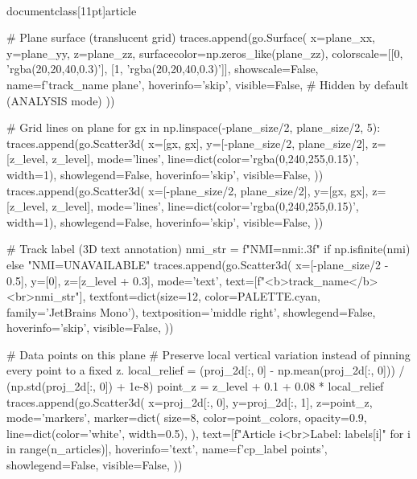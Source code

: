 \\documentclass[11pt]{article}
\begin{document}
\begin{CodeBlock}
{{{        # Plane surface (translucent grid)
        traces.append(go.Surface(
            x=plane_xx,
            y=plane_yy,
            z=plane_zz,
            surfacecolor=np.zeros_like(plane_zz),
            colorscale=[[0, 'rgba(20,20,40,0.3)'], [1, 'rgba(20,20,40,0.3)']],
            showscale=False,
            name=f'{track_name} plane',
            hoverinfo='skip',
            visible=False,  # Hidden by default (ANALYSIS mode)
        ))

        # Grid lines on plane
        for gx in np.linspace(-plane_size/2, plane_size/2, 5):
            traces.append(go.Scatter3d(
                x=[gx, gx],
                y=[-plane_size/2, plane_size/2],
                z=[z_level, z_level],
                mode='lines',
                line=dict(color='rgba(0,240,255,0.15)', width=1),
                showlegend=False,
                hoverinfo='skip',
                visible=False,
            ))
            traces.append(go.Scatter3d(
                x=[-plane_size/2, plane_size/2],
                y=[gx, gx],
                z=[z_level, z_level],
                mode='lines',
                line=dict(color='rgba(0,240,255,0.15)', width=1),
                showlegend=False,
                hoverinfo='skip',
                visible=False,
            ))

        # Track label (3D text annotation)
        nmi_str = f"NMI={nmi:.3f}" if np.isfinite(nmi) else "NMI=UNAVAILABLE"
        traces.append(go.Scatter3d(
            x=[-plane_size/2 - 0.5],
            y=[0],
            z=[z_level + 0.3],
            mode='text',
            text=[f"<b>{track_name}</b><br>{nmi_str}"],
            textfont=dict(size=12, color=PALETTE.cyan, family='JetBrains Mono'),
            textposition='middle right',
            showlegend=False,
            hoverinfo='skip',
            visible=False,
        ))

        # Data points on this plane
        # Preserve local vertical variation instead of pinning every point to a fixed z.
        local_relief = (proj_2d[:, 0] - np.mean(proj_2d[:, 0])) / (np.std(proj_2d[:, 0]) + 1e-8)
        point_z = z_level + 0.1 + 0.08 * local_relief
        traces.append(go.Scatter3d(
            x=proj_2d[:, 0],
            y=proj_2d[:, 1],
            z=point_z,
            mode='markers',
            marker=dict(
                size=8,
                color=point_colors,
                opacity=0.9,
                line=dict(color='white', width=0.5),
            ),
            text=[f"Article {i}<br>Label: {labels[i]}" for i in range(n_articles)],
            hoverinfo='text',
            name=f'{cp_label} points',
            showlegend=False,
            visible=False,
        ))

}}}
\end{CodeBlock}
\end{document}
